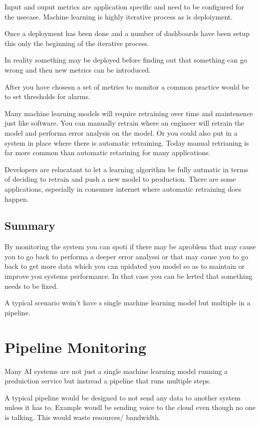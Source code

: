 Input and ouput metrics are application specific and need to be configured for the usecase. Machine learning is highly iterative process as is deploiyment.

Once a deployment has been done and a number of dashboards have been setup this only the beginning of the iterative process.

In reality something may be deployed before finding out that something can go wrong and then new metrics can be introduced.

After you have chosesn a set of metrics to monitor a common practice would be to set thresholds for alarms.

Many machine learning models will require retraining over time and maintenence just like software.
You can manually retrain where an engineer will retrain the model and performa error analysis on the model.
Or you could also put in a system in place where there is automatic retraining.
Today manual retrianing is far more common than automatic retarining for many applications.


Developers are relucatant to let a learning algorithm be fully autmatic in terms of deciding to retrain and push a new model to production.
There are some applications, especially in consumer internet where automatic retraining does happen.

\subsection{Summary}
By monitoring the system you can spoti if there may be aproblem that may cause you to go back to performa a deeper error analyssi or that may cause you to go back to get more data which you can upidated you model so as to maintain or improve you systems performance.
In that case you can be lerted that something needs to be fixed.

A typical scenario woin't have s single machine learning model but multiple in a pipeline.

\section{Pipeline Monitoring}

Many AI systems are not just a single machine learning model running a preduiction service but instread a pipeline that runs multiple steps.

A typical pipeline would be designed to not send any data to another system unless it has to. Example woudl be sending voice to the cloud even though no one is talking. This would waste resources/ bandwidth.

